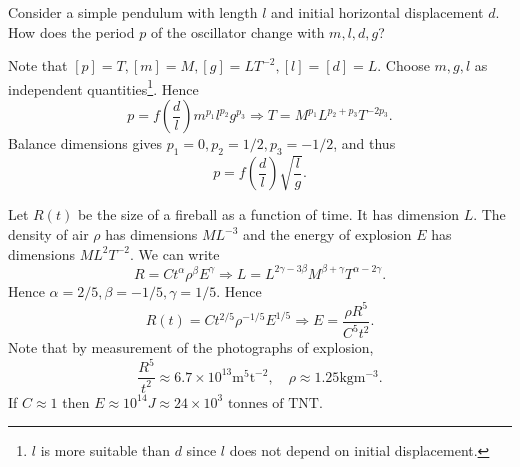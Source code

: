 \begin{example}\label{eg:simple pendulum}
    Consider a simple pendulum with length $l$ and initial horizontal displacement $d$. How does the period $p$ of the oscillator change with $m,l,d,g$?
    \begin{center}
    \end{center}
    Note that $ [p]=T, [m]=M, [g]=LT^{-2}, [l]=[d]=L $. Choose $m,g,l$ as independent quantities\footnote{$l$ is more suitable than $d$ since $l$ does not depend on initial displacement.}. Hence 
    \[
        p = f\left( \frac{d}{l} \right)m^{p_1}l^{p_2}g^{p_3} \Longrightarrow T=M^{p_1}L^{p_2+p_3}T^{-2p_3}.
    \]
    Balance dimensions gives $ p_1=0, p_2= 1/2, p_3=-1/2$, and thus 
    \[
        p = f\left( \frac{d}{l} \right) \sqrt{\frac{l}{g}}.
    \]
\end{example}
\begin{example}
    Let $ R(t) $ be the size of a fireball as a function of time. It has dimension $ L $. The density of air $\rho$ has dimensions $ ML^{-3} $ and the energy of explosion $E$ has dimensions $ ML^2T^{-2} $. We can write 
    \[
        R = C t^{\alpha}\rho^{\beta}E^{\gamma}\Longrightarrow L=L^{2\gamma-3\beta}M^{\beta+\gamma}T^{\alpha-2\gamma}.
    \]
    Hence $ \alpha=2/5 , \beta=-1/5,\gamma=1/5 $. Hence
    \[
        R(t)=C t^{2/5}\rho^{-1/5}E^{1/5} \Longrightarrow E = \frac{\rho R^5}{C^5 t^2}.
    \]
    Note that by measurement of the photographs of explosion,
    \[
        \frac{R^5}{t^2} \approx 6.7 \times 10^{13} \mathrm{m}^5 \mathrm{t}^{-2},\quad \rho \approx 1.25 \mathrm{kg} \mathrm{m}^{-3}.
    \]
    If $C\approx 1$ then $ E \approx 10^{14}J \approx 24 \times 10^{3} \text{ tonnes of TNT} $.
\end{example}